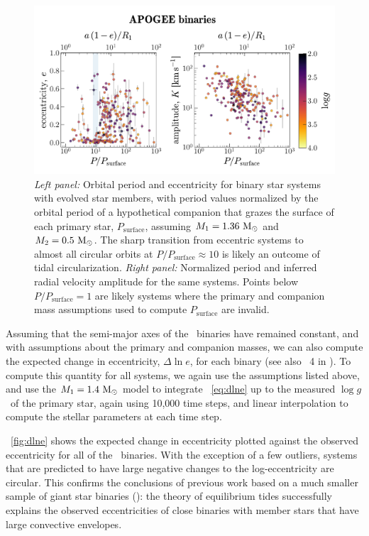 \documentclass[modern, letterpaper]{aastex62}
\newcommand{\apogee}{\project{\acronym{APOGEE}}}
\newcommand{\logg}{\ensuremath{\log g}}
\begin{document}
\begin{figure}[h]
\begin{center}
\includegraphics[width=\textwidth]{P-e-K}
\end{center}
\caption{%
\textit{Left panel:} Orbital period and eccentricity for binary star systems
with evolved star members, with period values normalized by the orbital period
of a hypothetical companion that grazes the surface of each primary star,
$P_{\textrm{surface}}$, assuming $M_1 = 1.36~\mathrm{M}_\odot$ and $M_2 = 0.5~\mathrm{M}_\odot$.
The sharp transition from eccentric systems to almost all circular orbits at
$P/P_\textrm{surface} \approx 10$ is likely an outcome of tidal circularization.
\textit{Right panel:} Normalized period and inferred radial velocity amplitude
for the same systems.
Points below $P/P_\textrm{surface} = 1$ are likely systems where the primary and
companion mass assumptions used to compute $P_\textrm{surface}$ are invalid.
\label{fig:PeK}
}
\end{figure}

Assuming that the semi-major axes of the \apogee\ binaries have remained
constant, and with assumptions about the primary and companion masses, we can
also compute the expected change in eccentricity, $\Delta \ln e$, for each
binary (see also \figurename~4 in \citealt{Verbunt:1995}).
To compute this quantity for all systems, we again use the assumptions listed
above, and use the $M_1 = 1.4~\mathrm{M}_\odot$  model to integrate
\eqname~\ref{eq:dlne} up to the measured \logg\ of the primary star, again using
10,000 time steps, and linear interpolation to compute the stellar parameters at
each time step.

\figurename~\ref{fig:dlne} shows the expected change in eccentricity plotted
against the observed eccentricity for all of the \apogee\ binaries.
With the exception of a few outliers, systems that are predicted to have large
negative changes to the log-eccentricity are circular.
This confirms the conclusions of previous work based on a much smaller sample of
giant star binaries (\citealt{Verbunt:1995}): the theory of equilibrium tides
successfully explains the observed eccentricities of close binaries with
member stars that have large convective envelopes.
\end{document}
